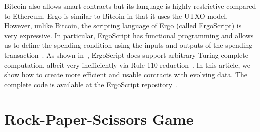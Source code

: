 \documentclass[runningheads]{llncs}
\newcommand{\langname}{ErgoScript\xspace}
\begin{document}
Bitcoin also allows smart contracts but its language is highly restrictive compared to Ethereum. Ergo is similar to Bitcoin in that it uses the UTXO model. However, unlike Bitcoin, the scripting language of Ergo (called \langname) is very expressive. In particular, \langname has functional programming and allows us to 
define the spending condition using the inputs and outputs of the spending transaction~\cite{whitepaper}. As shown in~\cite{CKM18a}, \langname does support arbitrary Turing complete computation, albeit very inefficiently via Rule 110 reduction~\cite{NW06}. In this article, we show how to create more efficient and usable contracts with evolving data. The complete code is available at the \langname repository~\cite{langrepo}.%

%
%

\section{Rock-Paper-Scissors Game}
\label{rps}
\end{document}
